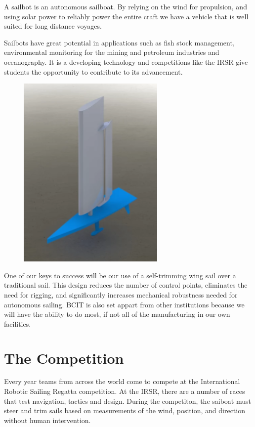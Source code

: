 \documentclass{article}
\begin{document}
A sailbot is an autonomous sailboat. By relying on the wind for propulsion, and 
using solar power to reliably power the entire craft we have a vehicle that is
well suited for long distance voyages.

Sailbots have great potential in applications such as fish stock management, 
environmental monitoring for the mining and petroleum industries and 
oceanography. It is a developing technology and competitions like the IRSR give
students the opportunity to contribute to its advancement.

\begin{figure}[H]
    \centering
    \includegraphics[scale=0.6]{sailbotRender.png}
\end{figure}

One of our keys to success will be our use of a self-trimming wing sail over
a traditional sail. This design reduces the number of control points, eliminates
the need for rigging, and significantly increases mechanical robustness needed
for autonomous sailing. BCIT is also set appart from other institutions because
we will have the ability to do most, if not all of the manufacturing in our own
facilities.

\section*{The Competition}

Every year teams from across the world come to compete at the International 
Robotic Sailing Regatta competition. At the IRSR, there are a number of races 
that test navigation, tactics and design. During the competiton, the saiboat 
must steer and trim sails based on measurements of the wind, position, and 
direction without human intervention. 
\end{document}
